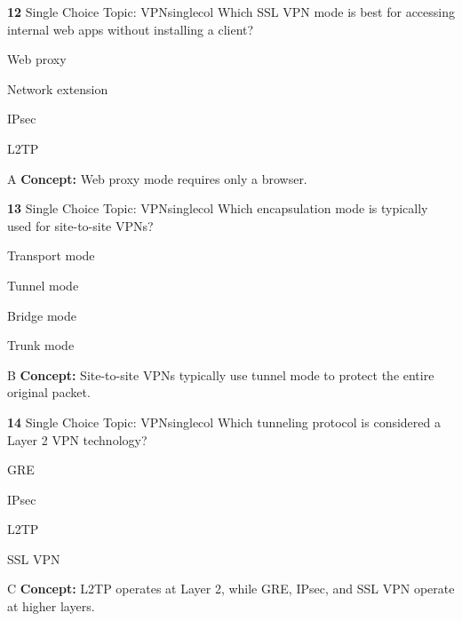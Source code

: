 \documentclass[10pt,a4paper]{article}
\begin{document}
\begin{qcard}{\color{white}\textbf{12} \hfill \small Single Choice \textbar{} Topic: VPN}{singlecol}
Which SSL VPN mode is best for accessing internal web apps without installing a client?

\begin{qoptions}
\item Web proxy
\item Network extension
\item IPsec
\item L2TP
\end{qoptions}
\begin{explainbox}{A}
\textbf{Concept:} Web proxy mode requires only a browser.
\end{explainbox}
\end{qcard}

\begin{qcard}{\color{white}\textbf{13} \hfill \small Single Choice \textbar{} Topic: VPN}{singlecol}
Which encapsulation mode is typically used for site-to-site VPNs?

\begin{qoptions}
\item Transport mode
\item Tunnel mode
\item Bridge mode
\item Trunk mode
\end{qoptions}
\begin{explainbox}{B}
\textbf{Concept:} Site-to-site VPNs typically use tunnel mode to protect the entire original packet.
\end{explainbox}
\end{qcard}

\begin{qcard}{\color{white}\textbf{14} \hfill \small Single Choice \textbar{} Topic: VPN}{singlecol}
Which tunneling protocol is considered a Layer 2 VPN technology?

\begin{qoptions}
\item GRE
\item IPsec
\item L2TP
\item SSL VPN
\end{qoptions}
\begin{explainbox}{C}
\textbf{Concept:} L2TP operates at Layer 2, while GRE, IPsec, and SSL VPN operate at higher layers.
\end{explainbox}
\end{qcard}
\end{document}
